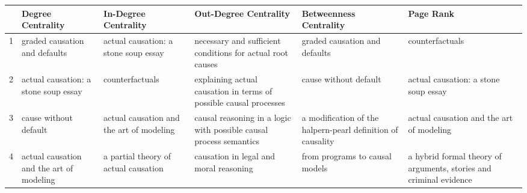 \documentclass[11pt,a4paper]{book}
\theoremstyle{definition}
\theoremstyle{definition}
\theoremstyle{definition}
\theoremstyle{remark}
\begin{document}
\begin{table}
\centering
\scriptsize
\begin{tabular}{l p{3.7cm} p{3.7cm}p{3.7cm} p{3.7cm}p{3.7cm} }
\toprule
{} &                                                             Degree Centrality &                                                                                   In-Degree Centrality &                                                                 Out-Degree Centrality &                                                                                   Betweenness Centrality &                                                                                    Page Rank \\
\midrule
1  &                                      graded causation and defaults &                                                        actual causation: a stone soup essay &                 necessary and sufficient conditions for actual root causes &                                                             graded causation and defaults &                                                                             counterfactuals \\
2  &                               actual causation: a stone soup essay &                                                                             counterfactuals &          explaining actual causation in terms of possible causal processes &                                                                     cause without default &                                                        actual causation: a stone soup essay \\
3  &                                              cause without default &                                                    actual causation and the art of modeling &         causal reasoning in a logic with possible causal process semantics &                               a modification of the halpern-pearl definition of causality &                                                    actual causation and the art of modeling \\
4  &                           actual causation and the art of modeling &                                                        a partial theory of actual causation &                                     causation in legal and moral reasoning &                                                            from programs to causal models &                          a hybrid formal theory of arguments, stories and criminal evidence \\

\end{tabular}
\end{table}
\end{document}
